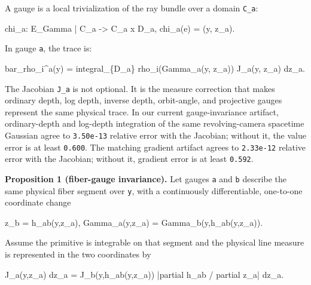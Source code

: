 \documentclass[
]{article}
\newenvironment{Shaded}{}{}
\newcommand{\NormalTok}[1]{#1}
\begin{document}
A gauge is a local trivialization of the ray bundle over a domain
\texttt{C\_a}:

\begin{Shaded}
\begin{Highlighting}[]
\NormalTok{chi\_a: E\_Gamma | C\_a {-}\textgreater{} C\_a x D\_a,}
\NormalTok{chi\_a(e) = (y, z\_a).}
\end{Highlighting}
\end{Shaded}

In gauge \texttt{a}, the trace is:

\begin{Shaded}
\begin{Highlighting}[]
\NormalTok{bar\_rho\_i\^{}a(y)}
\NormalTok{  = integral\_\{D\_a\} rho\_i(Gamma\_a(y, z\_a)) J\_a(y, z\_a) dz\_a.}
\end{Highlighting}
\end{Shaded}

The Jacobian \texttt{J\_a} is not optional. It is the measure correction
that makes ordinary depth, log depth, inverse depth, orbit-angle, and
projective gauges represent the same physical trace. In our current
gauge-invariance artifact, ordinary-depth and log-depth integration of
the same revolving-camera spacetime Gaussian agree to \texttt{3.50e-13}
relative error with the Jacobian; without it, the value error is at
least \texttt{0.600}. The matching gradient artifact agrees to
\texttt{2.33e-12} relative error with the Jacobian; without it, gradient
error is at least \texttt{0.592}.

\textbf{Proposition 1 (fiber-gauge invariance).} Let gauges \texttt{a}
and \texttt{b} describe the same physical fiber segment over \texttt{y},
with a continuously differentiable, one-to-one coordinate change

\begin{Shaded}
\begin{Highlighting}[]
\NormalTok{z\_b = h\_ab(y,z\_a),}
\NormalTok{Gamma\_a(y,z\_a) = Gamma\_b(y,h\_ab(y,z\_a)).}
\end{Highlighting}
\end{Shaded}

Assume the primitive is integrable on that segment and the physical line
measure is represented in the two coordinates by

\begin{Shaded}
\begin{Highlighting}[]
\NormalTok{J\_a(y,z\_a) dz\_a}
\NormalTok{  = J\_b(y,h\_ab(y,z\_a)) |partial h\_ab / partial z\_a| dz\_a.}
\end{Highlighting}
\end{Shaded}
\end{document}
